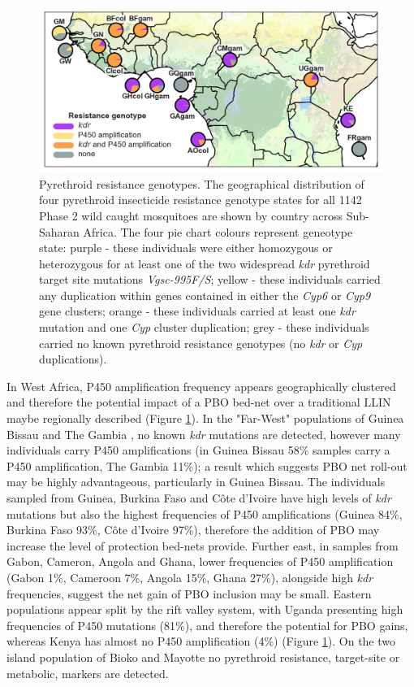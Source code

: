 \documentclass[a4paper,11pt,abstracton,hidelinks]{scrartcl}
\begin{document}
\begin{figure}[H]
	\begin{center}
		\includegraphics*[width=6.3in]{artwork/pyrethroid_resistance_simplified.jpg}
	\end{center}
	\caption{Pyrethroid resistance genotypes. The geographical distribution of four pyrethroid insecticide resistance genotype states for all 1142 Phase 2 wild caught mosquitoes are shown by country across Sub-Saharan Africa. The four pie chart colours represent geneotype state: purple - these individuals were either homozygous or heterozygous for at least one of the two widespread \textit{kdr} pyrethroid target site mutations \textit{Vgsc-995F/S}; yellow - these individuals carried any duplication within genes contained in either the \textit{Cyp6} or \textit{Cyp9} gene clusters; orange - these individuals carried at least one \textit{kdr} mutation and one \textit{Cyp} cluster duplication; grey - these individuals carried no known pyrethroid resistance genotypes (no \textit{kdr} or \textit{Cyp} duplications).}
	\label{ir}
\end{figure}


In West Africa, P450 amplification frequency appears geographically clustered and therefore the potential impact of a PBO bed-net over a traditional LLIN maybe regionally described (Figure \ref{ir}).
%
In the "Far-West" populations of Guinea Bissau and The Gambia \cite{caputo2011}, no known \textit{kdr} mutations are detected, however many individuals carry P450 amplifications (in Guinea Bissau 58\% samples carry a P450 amplification, The Gambia 11\%); 
%
a result which suggests PBO net roll-out may be highly advantageous, particularly in Guinea Bissau.
%
The individuals sampled from Guinea, Burkina Faso and C\^{o}te d'Ivoire have high levels of \textit{kdr} mutations but also the highest frequencies of P450 amplifications (Guinea 84\%, Burkina Faso 93\%, C\^{o}te d'Ivoire 97\%), therefore the addition of PBO may increase the level of protection bed-nets provide.
%
Further east, in samples from Gabon, Cameron, Angola and Ghana, lower frequencies of P450 amplification (Gabon 1\%, Cameroon 7\%, Angola 15\%, Ghana 27\%), alongside high \textit{kdr} frequencies, suggest the net gain of PBO inclusion may be small.
%
Eastern populations appear split by the rift valley system, with Uganda presenting high frequencies of P450 mutations (81\%), and therefore the potential for PBO gains, whereas Kenya has almost no P450 amplification (4\%) (Figure \ref{ir}).
%
On the two island population of Bioko and Mayotte no pyrethroid resistance, target-site or metabolic, markers are detected.
\end{document}

